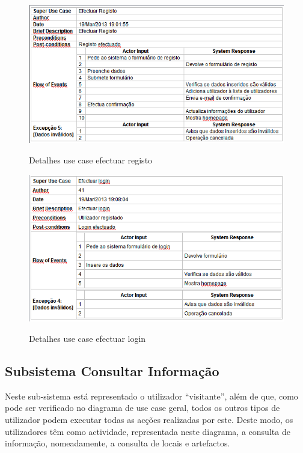 ﻿\documentclass[12pt,a4paper]{article}
\begin{document}
\begin{figure}[h!]
\centering
\includegraphics[scale=0.7]{d_usecase/registo}
\label{usecase}
\caption{Detalhes use case efectuar registo}
\end{figure}

\clearpage
\newpage

\begin{figure}[h!]
\centering
\includegraphics[scale=0.7]{d_usecase/login}
\label{usecase}
\caption{Detalhes use case efectuar login}
\end{figure}

\subsection{Subsistema Consultar Informação}
Neste sub-sistema está representado o utilizador ``visitante'', além de que, como pode ser verificado no diagrama de use case geral, todos os outros tipos de utilizador podem executar todas as acções realizadas por este. Deste modo, os utilizadores têm como actividade, representada neste diagrama, a consulta de informação, nomeadamente, a consulta de locais e artefactos.\\
\end{document}
